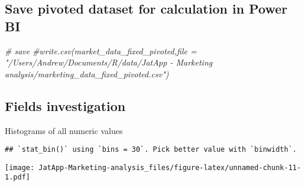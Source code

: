\documentclass[]{article}
\newenvironment{Shaded}{\begin{snugshade}}{\end{snugshade}}
\newcommand{\CommentTok}[1]{\textcolor[rgb]{0.56,0.35,0.01}{\textit{#1}}}
\newcommand{\DataTypeTok}[1]{\textcolor[rgb]{0.13,0.29,0.53}{#1}}
\newcommand{\KeywordTok}[1]{\textcolor[rgb]{0.13,0.29,0.53}{\textbf{#1}}}
\newcommand{\NormalTok}[1]{#1}
\newcommand{\OperatorTok}[1]{\textcolor[rgb]{0.81,0.36,0.00}{\textbf{#1}}}
\newcommand{\StringTok}[1]{\textcolor[rgb]{0.31,0.60,0.02}{#1}}
\begin{document}
\hypertarget{save-pivoted-dataset-for-calculation-in-power-bi}{%
\subsection{Save pivoted dataset for calculation in Power
BI}\label{save-pivoted-dataset-for-calculation-in-power-bi}}

\begin{Shaded}
\begin{Highlighting}[]
\CommentTok{# save }
\CommentTok{#write.csv(market_data_fixed_pivoted,file = "/Users/Andrew/Documents/R/data/JatApp - Marketing analysis/marketing_data_fixed_pivoted.csv")}
\end{Highlighting}
\end{Shaded}

\hypertarget{fields-investigation}{%
\subsection{Fields investigation}\label{fields-investigation}}

Histograms of all numeric values

\begin{Shaded}
\end{Shaded}

\begin{verbatim}
## `stat_bin()` using `bins = 30`. Pick better value with `binwidth`.
\end{verbatim}

\texttt{[image: JatApp-Marketing-analysis\_files/figure-latex/unnamed-chunk-11-1.pdf]}
\end{document}
